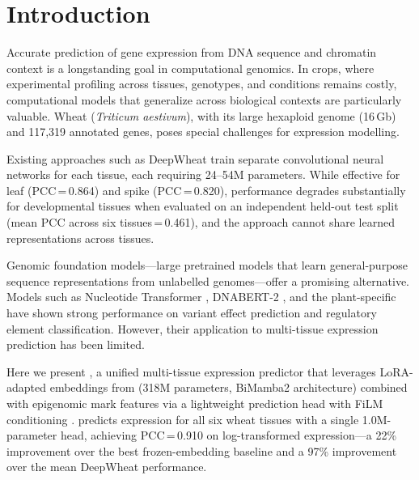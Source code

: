 \section{Introduction}\label{sec:introduction}

Accurate prediction of gene expression from DNA sequence and chromatin context is a longstanding goal in computational genomics. In crops, where experimental profiling across tissues, genotypes, and conditions remains costly, computational models that generalize across biological contexts are particularly valuable. Wheat (\textit{Triticum aestivum}), with its large hexaploid genome (16\,Gb) and 117,319 annotated genes, poses special challenges for expression modelling.

Existing approaches such as DeepWheat \citep{DeepWheat2024} train separate convolutional neural networks for each tissue, each requiring 24--54M parameters. While effective for leaf (PCC\,=\,0.864) and spike (PCC\,=\,0.820), performance degrades substantially for developmental tissues when evaluated on an independent held-out test split (mean PCC across six tissues\,=\,0.461), and the approach cannot share learned representations across tissues.

Genomic foundation models---large pretrained models that learn general-purpose sequence representations from unlabelled genomes---offer a promising alternative. Models such as Nucleotide Transformer \citep{DallaTorre2023}, DNABERT-2 \citep{Zhou2024}, and the plant-specific \botanic \citep{Botanic2025} have shown strong performance on variant effect prediction and regulatory element classification. However, their application to multi-tissue expression prediction has been limited.

Here we present \mytool, a unified multi-tissue expression predictor that leverages LoRA-adapted \citep{Hu2022} embeddings from \botanic (318M parameters, BiMamba2 architecture) combined with epigenomic mark features via a lightweight prediction head with FiLM conditioning \citep{Perez2018}. \mytool predicts expression for all six wheat tissues with a single 1.0M-parameter head, achieving PCC\,=\,0.910 on log-transformed expression---a 22\% improvement over the best frozen-embedding baseline and a 97\% improvement over the mean DeepWheat performance.

